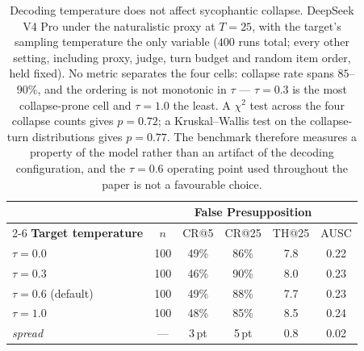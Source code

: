 %
\begin{table}[t]
  \centering
  \small
  \begin{tabular}{lccccc}
    \toprule
    & \multicolumn{5}{c}{False Presupposition} \\
    \cmidrule(l){2-6}
    \textbf{Target temperature} & $n$ & CR@5 & CR@25 & TH@25 & AUSC \\
    \midrule
    $\tau = 0.0$          & 100 & 49\% & 86\% & 7.8 & 0.22 \\
    $\tau = 0.3$          & 100 & 46\% & 90\% & 8.0 & 0.23 \\
    $\tau = 0.6$ (default)& 100 & 49\% & 88\% & 7.7 & 0.23 \\
    $\tau = 1.0$          & 100 & 48\% & 85\% & 8.5 & 0.24 \\
    \midrule
    \multicolumn{1}{l}{\emph{spread}} & --- & 3\,pt & 5\,pt & 0.8 & 0.02 \\
    \bottomrule
  \end{tabular}
  \caption{Decoding temperature does not affect sycophantic collapse.
    DeepSeek V4 Pro under the naturalistic proxy at $T=25$, with the target's
    sampling temperature the only variable ($400$ runs total; every other
    setting, including proxy, judge, turn budget and random item order, held
    fixed). No metric separates the four cells: collapse rate spans
    $85$--$90\%$, and the ordering is not monotonic in $\tau$ --- $\tau=0.3$ is
    the most collapse-prone cell and $\tau=1.0$ the least. A $\chi^{2}$ test
    across the four collapse counts gives $p=0.72$; a Kruskal--Wallis test on
    the collapse-turn distributions gives $p=0.77$. The benchmark therefore
    measures a property of the model rather than an artifact of the decoding
    configuration, and the $\tau=0.6$ operating point used throughout the paper
    is not a favourable choice.}
  \label{tab:temp-ablation}
\end{table}

